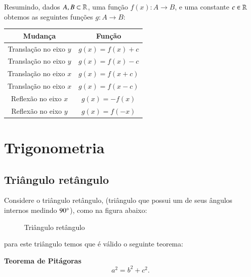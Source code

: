  Resumindo, dados $A, B \subset \mathbb{R}$, uma função $f(x): A \to B$, e uma constante $c \in \mathbb{R}$ obtemos as seguintes funções $g: A \to B$:
  \begin{table}[H]
 \centering
 \begin{tabular}{|c|c|} \hline
 \rowcolor{cinza}
  Mudança & Função \\\hline
  Translação no eixo $y$ & $g(x)= f(x)+ c$ \\\hline
  Translação no eixo $y$ & $g(x)= f(x)- c$ \\\hline
  Translação no eixo $x$ & $g(x)= f(x+ c)$ \\\hline
  Translação no eixo $x$ & $g(x)= f(x- c)$ \\\hline
  Reflexão no eixo $x$ & $g(x)= -f(x)$ \\\hline
  Reflexão no eixo $y$ & $g(x)= f(-x)$ \\\hline
 \end{tabular}
\end{table}
 
  \newpage
  \section{Trigonometria}

 \subsection{Triângulo retângulo}

  Considere o triângulo retângulo, (triângulo que possui um de seus ângulos internos medindo $90 \degree$), como na figura abaixo:
  \begin{figure}[H]
   \centering
   \caption{Triângulo retângulo}
  \end{figure}
 para este triângulo temos que é válido o seguinte teorema:

 \vskip0.3cm

\colorbox{azul}{
 \begin{minipage}{0.9\linewidth}
 \begin{center}
 \textbf{Teorema de Pitágoras}
  \[a^2= b^2 + c^2.\]
 \end{center}
 \end{minipage}}

